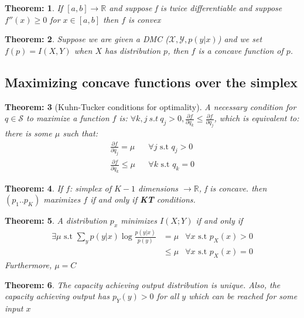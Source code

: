 \documentclass[11pt, a4paper]{scrartcl}
\newtheorem{theorem}{Theorem:}[section]
\begin{document}
\begin{theorem} If $[a,b] \to \mathbb R$ and suppose f is twice differentiable and suppose $f''(x) \geq 0$ for $x\in [a,b] $ then $f$ is convex
\end{theorem}

\begin{theorem} Suppose we are given a DMC ($\mathcal X, \mathcal Y, p(y|x)$) and we set $f(p)=I(X,Y)$ when $X$ has distribution $p$, then $f$ is a concave function of $p$. 
\end{theorem}

\subsection{Maximizing concave functions over the simplex}

\begin{theorem}[Kuhn-Tucker conditions for optimality]
A necessary condition for $q\in \mathcal S$ to maximize a function $f$ is: $\forall k,j\ s.t\ q_j>0,  \frac{\partial f}{\partial q_k} \leq \frac{\partial f}{\partial q_j}$, which is equivalent to:  there is some $\mu$ such that: 
\begin{align*}
\frac{\partial f}{\partial q_j} = \mu && \forall j \text{ s.t } q_j>0 \\  
\frac{\partial f}{\partial q_k} \leq \mu && \forall k \text{ s.t } q_k=0
\end{align*}
\end{theorem}

\begin{theorem} If $f$: simplex of $K-1$ dimensions $\to \mathbb R$, f is concave. then $(p_1 .. p_K)$ maximizes $f$ if and only if \textbf{KT} conditions. 
\end{theorem}

\begin{theorem} A distribution $p_x$ minimizes $I(X;Y)$ if and only if 
\begin{align*} \exists \mu \text{ s.t } \sum_y p(y|x) \log \frac{p(y|x)}{p(y)} &= \mu & \forall x \text{ s.t } p_X(x) >0\\
											&\leq \mu  & \forall x \text{ s.t } p_X(x) =0
\end{align*}
Furthermore, $\mu = C$
\end{theorem}

\begin{theorem} The capacity achieving output distribution is unique. Also, the capacity achieving output has $p_Y(y) >0$ for all $y$ which can be reached for some input $x$
\end{theorem}
\end{document}
